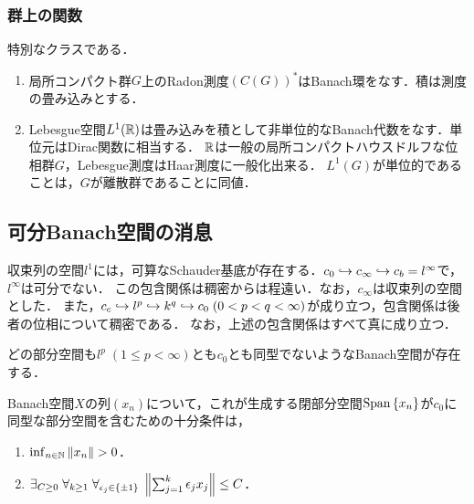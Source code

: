 \documentclass[uplatex,dvipdfmx]{jsreport}
\begin{document}
\subsubsection{群上の関数}

\begin{example}
    特別なクラスである．
    \begin{enumerate}
        \item 局所コンパクト群$G$上のRadon測度$(C(G))^*$はBanach環をなす．積は測度の畳み込みとする．
        \item Lebesgue空間$L^1(\mathbb{R})$は畳み込みを積として非単位的なBanach代数をなす．単位元はDirac関数に相当する．
        $\mathbb{R}$は一般の局所コンパクトハウスドルフな位相群$G$，Lebesgue測度はHaar測度に一般化出来る．
        $L^1(G)$が単位的であることは，$G$が離散群であることに同値．
    \end{enumerate}
\end{example}

\subsection{可分Banach空間の消息}

\begin{tcolorbox}[colframe=ForestGreen, colback=ForestGreen!10!white,breakable,colbacktitle=ForestGreen!40!white,coltitle=black,fonttitle=\bfseries\sffamily,
title=]
    収束列の空間$l^1$には，可算なSchauder基底が存在する．$c_0\hookrightarrow c_\infty\hookrightarrow c_b=l^\infty$で，$l^\infty$は可分でない．
    この包含関係は稠密からは程遠い．なお，$c_\infty$は収束列の空間とした．
    また，$c_c\hookrightarrow l^p\hookrightarrow k^q\hookrightarrow c_0\;(0<p<q<\infty)$が成り立つ，包含関係は後者の位相について稠密である．
    なお，上述の包含関係はすべて真に成り立つ．
\end{tcolorbox}

\begin{example}
    どの部分空間も$l^p\;(1\le p<\infty)$とも$c_0$とも同型でないようなBanach空間が存在する．
\end{example}

\begin{theorem}\label{thm-Bessaga-and-Pelczynski}
    Banach空間$X$の列$(x_n)$について，これが生成する閉部分空間$\mathrm{Span}\left\{x_n\right\}$が$c_0$に同型な部分空間を含むための十分条件は，
    \begin{enumerate}
        \item $\inf_{n\in\N}\norm{x_n}>0$．
        \item $\exists_{C\ge0}\;\forall_{k\ge1}\;\forall_{\epsilon_j\in\{\pm 1\}}\;\left\|\sum^k_{j=1}\epsilon_jx_j\right\|\le C$．
    \end{enumerate}
\end{theorem}
\end{document}
